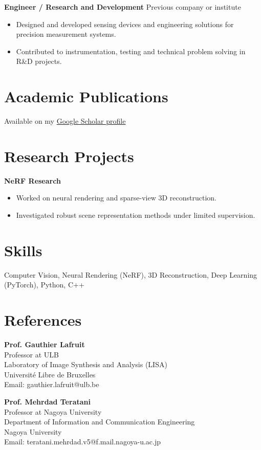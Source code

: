 \documentclass[11pt,a4paper]{article}
\begin{document}
\textbf{Engineer / Research and Development} \hfill Previous company or institute \\
        \begin{itemize}
            \item Designed and developed sensing devices and engineering solutions for precision measurement systems.
    \item Contributed to instrumentation, testing and technical problem solving in R\&D projects.
        \end{itemize}


\section*{Academic Publications}

Available on my \href{https://scholar.google.com/citations?user=gzbZN8MAAAAJ&hl=en}{Google Scholar profile}

\section*{Research Projects}
\textbf{NeRF Research}
\begin{itemize}
\item Worked on neural rendering and sparse-view 3D reconstruction.
\item Investigated robust scene representation methods under limited supervision.
\end{itemize}

\section*{Skills}
Computer Vision, Neural Rendering (NeRF), 3D Reconstruction, Deep Learning (PyTorch), Python, C++

\section*{References}

\begin{minipage}[t]{0.48\textwidth}
    \textbf{Prof. Gauthier Lafruit} \\
    Professor at ULB \\
    Laboratory of Image Synthesis and Analysis (LISA) \\
    Université Libre de Bruxelles \\
    Email: gauthier.lafruit@ulb.be
\end{minipage}%
\hfill
\begin{minipage}[t]{0.48\textwidth}
    \textbf{Prof. Mehrdad Teratani} \\
    Professor at Nagoya University \\
    Department of Information and Communication Engineering \\
    Nagoya University \\
    Email: teratani.mehrdad.v5@f.mail.nagoya-u.ac.jp
\end{minipage}
\end{document}
